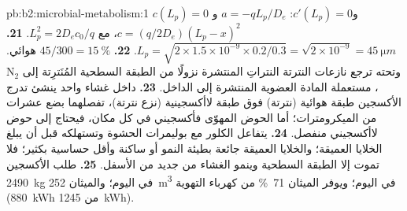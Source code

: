 \begin{solution}{pb:b2:microbial-metabolism:1}
$c(L_p) = 0$ و$c'(L_p) = 0$: $a = -qL_p/D_e$ و$c =
(q/2D_e)(L_p - x)^2$، مع $L_p^2 = 2D_ec_0/q$.
\textbf{21.} $L_p = \sqrt{2\times 1.5\times 10^{-9}\times 0.2/0.3} =
\sqrt{2\times 10^{-9}} = \qty{45}{\micro m}$.
\textbf{22.} $45/300 = \qty{15}{\%}$ هوائي. وتحته ترجع نازعات
النترتة النتراتِ المنتشرة نزولًا من الطبقة السطحية المُنَترِتة إلى
$\mathrm{N_2}$، مستعملة المادة العضوية المنتشرة إلى الداخل.
\textbf{23.} داخل غشاء واحد ينشئ تدرج الأكسجين طبقة هوائية (نترتة)
فوق طبقة لاأكسجينية (نزع نترتة)، تفصلهما بضع عشرات من
الميكرومترات؛ أما الحوض المهوّى فأكسجيني في كل مكان، فيحتاج  إلى حوض لاأكسجيني منفصل.
\textbf{24.} يتفاعل الكلور مع بوليمرات الحشوة وتستهلكه قبل أن يبلغ
الخلايا العميقة؛ والخلايا العميقة جائعة بطيئة النمو أو ساكنة وأقل
حساسية بكثير؛ فلا تموت إلا الطبقة السطحية وينمو الغشاء من جديد من
الأسفل.
\textbf{25.} طلب الأكسجين \qty{2490}{kg} في اليوم؛ والميثان
\qty{252}{m^3} في اليوم؛ ويوفر الميثان \qty{71}{\%} من كهرباء
التهوية (\qty{880}{kWh} من \qty{1245}{kWh}).
\end{solution}
